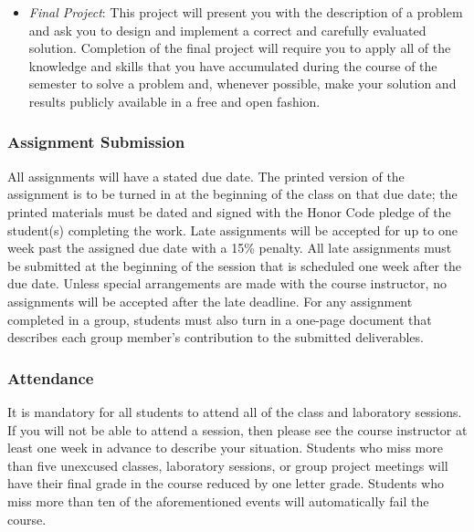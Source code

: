 \begin{itemize}
	\item {\em Final Project}: This project will present you with the description of a problem and ask you to design
	  and implement a correct and carefully evaluated solution. Completion of the final project will require you to
	  apply all of the knowledge and skills that you have accumulated during the course of the semester to solve a
	  problem and, whenever possible, make your solution and results publicly available in a free and open fashion.
		
\end{itemize}

\subsubsection*{Assignment Submission}

All assignments will have a stated due date. The printed version of the assignment is to be turned in at the beginning
of the class on that due date; the printed materials must be dated and signed with the Honor Code pledge of the
student(s) completing the work.  Late assignments will be accepted for up to one week past the assigned due date with a
15\% penalty. All late assignments must be submitted at the beginning of the session that is scheduled one week after
the due date. Unless special arrangements are made with the course instructor, no assignments will be accepted after the
late deadline. For any assignment completed in a group, students must also turn in a one-page document that describes
each group member's contribution to the submitted deliverables.  

\subsubsection*{Attendance}

It is mandatory for all students to attend all of the class and laboratory sessions. If you will not be able to attend a
session, then please see the course instructor at least one week in advance to describe your situation.  Students who
miss more than five unexcused classes, laboratory sessions, or group project meetings will have their final grade in the
course reduced by one letter grade. Students who miss more than ten of the aforementioned events will automatically fail
the course.

% 
% 

